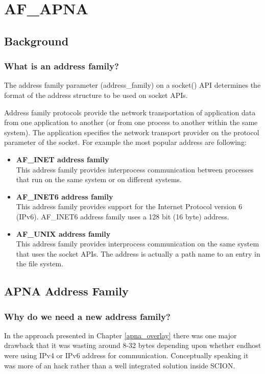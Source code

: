 
\chapter{AF\_APNA} %

\label{address_family}

\section{Background}
\subsection{What is an address family?}
The address family parameter (address\_family) on a socket() API determines the format of the address structure to be used on socket APIs.

Address family protocols provide the network transportation of application data from one application to another (or from one process to another within the same system). The application specifies the network transport provider on the protocol parameter of the socket. For example the most popular address are following:
\begin{itemize}
    \item \textbf{AF\_INET address family} \\
    This address family provides interprocess communication between processes that run on the same system or on different systems.
    \item \textbf{AF\_INET6 address family} \\
    This address family provides support for the Internet Protocol version 6 (IPv6). AF\_INET6 address family uses a 128 bit (16 byte) address.
    \item \textbf{AF\_UNIX address family} \\
    This address family provides interprocess communication on the same system that uses the socket APIs. The address is actually a path name to an entry in the file system.
\end{itemize}

\section{APNA Address Family}
\subsection{Why do we need a new address family?}
In the approach presented in Chapter \ref{apna_overlay} there was one major drawback that it was wasting around 8-32 bytes depending upon whether endhost were using IPv4 or IPv6 address for communication. Conceptually speaking it was more of an hack rather than a well integrated solution inside SCION. 

